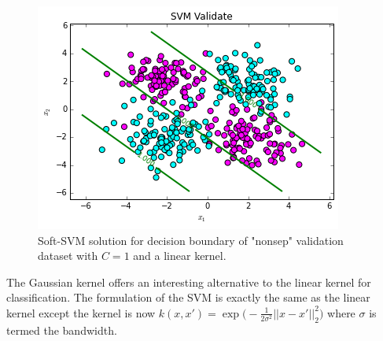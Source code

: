\documentclass[10pt]{article}
\begin{document}
\begin{figure}
\centering
\includegraphics[scale=0.5]{svm_nonsep_val.png}
\caption{Soft-SVM solution for decision boundary of "nonsep" validation dataset with $C=1$ and a linear kernel.}
\label{svm_nonsep}
\end{figure}

The Gaussian kernel offers an interesting alternative to the linear kernel for classification.  The formulation of the SVM is exactly the same as the linear kernel except the kernel is now $k(x,x') = \exp\big( - \frac{1}{2 \sigma^2} ||x-x'||_2^2  \big)$
where $\sigma$ is termed the bandwidth.  %
\end{document}
